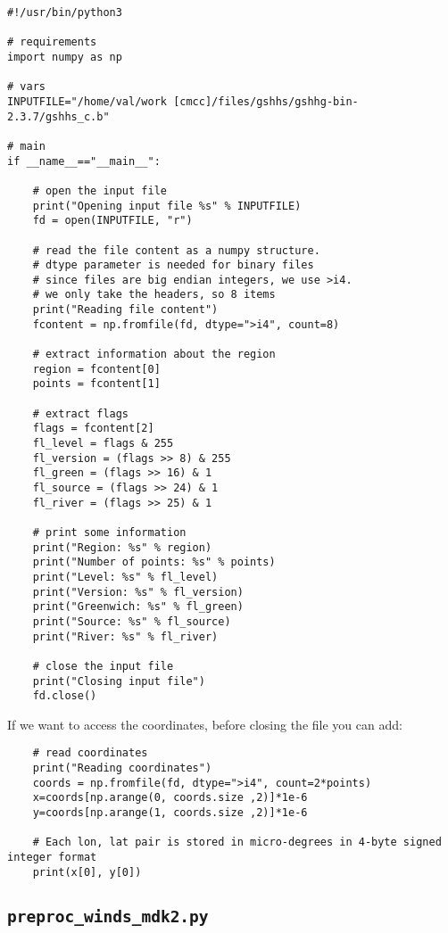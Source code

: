 \begin{lstlisting}[style=mypython]
#!/usr/bin/python3

# requirements
import numpy as np

# vars
INPUTFILE="/home/val/work [cmcc]/files/gshhs/gshhg-bin-2.3.7/gshhs_c.b"

# main
if __name__=="__main__":

    # open the input file
    print("Opening input file %s" % INPUTFILE)
    fd = open(INPUTFILE, "r")

    # read the file content as a numpy structure.
    # dtype parameter is needed for binary files
    # since files are big endian integers, we use >i4.
    # we only take the headers, so 8 items
    print("Reading file content")
    fcontent = np.fromfile(fd, dtype=">i4", count=8)

    # extract information about the region
    region = fcontent[0]
    points = fcontent[1]
    
    # extract flags
    flags = fcontent[2]
    fl_level = flags & 255
    fl_version = (flags >> 8) & 255
    fl_green = (flags >> 16) & 1
    fl_source = (flags >> 24) & 1
    fl_river = (flags >> 25) & 1

    # print some information
    print("Region: %s" % region)
    print("Number of points: %s" % points)
    print("Level: %s" % fl_level)
    print("Version: %s" % fl_version)
    print("Greenwich: %s" % fl_green)
    print("Source: %s" % fl_source)
    print("River: %s" % fl_river)     

    # close the input file
    print("Closing input file")
    fd.close()
\end{lstlisting}

If we want to access the coordinates, before closing the file you can add:

\begin{lstlisting}
    # read coordinates
    print("Reading coordinates")
    coords = np.fromfile(fd, dtype=">i4", count=2*points)
    x=coords[np.arange(0, coords.size ,2)]*1e-6
    y=coords[np.arange(1, coords.size ,2)]*1e-6

    # Each lon, lat pair is stored in micro-degrees in 4-byte signed integer format
    print(x[0], y[0])
\end{lstlisting}

\subsection{\texttt{preproc\_winds\_mdk2.py}}

